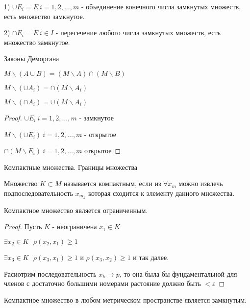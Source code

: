 \begin{block}[Свойства]
  1) $\cup E_i = E ~ i = 1,2, \ldots, m$ - объединение конечного числа
  замкнутых множеств, есть множество замкнутое.

  2) $\cap E_i = E ~ i \in I$ - пересечение любого числа замкнутых множеств,
  есть множество замкнутое.

  Законы Деморгана

  $M \backslash (A \cup B) = (M \backslash A) \cap (M \backslash B)$

  $M \backslash (\cup A_i) = \cap (M \backslash A_i)$

  $M \backslash (\cap A_i) = \cup (M \backslash A_i)$

  \begin{proof}
    $\cup E_i ~ i = 1,2, \ldots, m$ - замкнутое

    $M \backslash (\cup E_i) ~ i = 1,2, \ldots, m$ - открытое

    $\cap (M \backslash E_i) ~ i = 1,2, \ldots, m$ открытое
  \end{proof}
\end{block}

\begin{title}[\Large]
  Компактные множества. Границы множества
\end{title}

\begin{define}
  Множество $K \subset M$ называется компактным, если из $\forall x_m$ можно
  извлечь подпоследовательность $x_{m_k}$ которая сходится к элементу данного
  множества.
\end{define}

\begin{theorem}
  Компактное множество является ограниченным.
\end{theorem}

\begin{proof}
  Пусть $K$ - неограничена $x_1 \in K$

  $\exists x_2 \in K ~~~ \rho(x_2, x_1) \ge 1$

  $\exists x_3 \in K ~~~ \rho(x_3, x_1) \ge 1$ и $\rho(x_3, x_2) \ge 1$ и так
  далее.

  Расиотрим последовательность $x_k \to p$, то она была бы фундаментальной для
  членов с достаточно большими номерами растояние должно быть $< \varepsilon$
\end{proof}

\begin{theorem}
  Компактное множество в любом метрическом пространстве является замкнутым.
\end{theorem}

